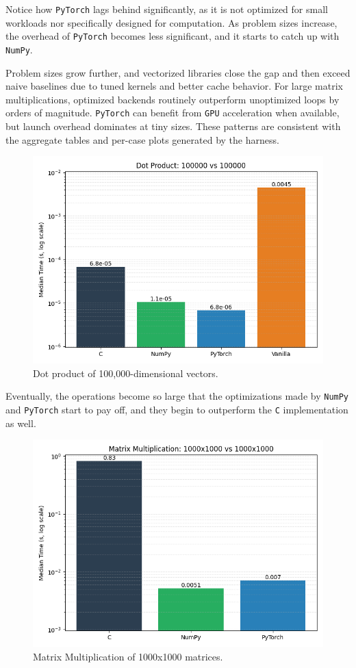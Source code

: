 \documentclass[a4paper,12pt]{article}
\begin{document}
Notice how \texttt{PyTorch} lags behind significantly, as it is not optimized for small workloads nor specifically designed for computation. As problem sizes increase, the overhead of \texttt{PyTorch} becomes less significant, and it starts to catch up with \texttt{NumPy}.

Problem sizes grow further, and vectorized libraries close the gap and then exceed naive baselines due to tuned kernels and better cache behavior. For large matrix multiplications, optimized backends routinely outperform unoptimized loops by orders of magnitude. \texttt{PyTorch} can benefit from \texttt{GPU} acceleration when available, but launch overhead dominates at tiny sizes. These patterns are consistent with the aggregate tables and per-case plots generated by the harness.

\begin{figure}[H]
  \centering
  \includegraphics[width=0.7\linewidth]{results/bar/DOT_100000_100000.png}
  \caption{Dot product of 100{,}000-dimensional vectors.}
  \label{fig:three}
\end{figure}

Eventually, the operations become so large that the optimizations made by \texttt{NumPy} and \texttt{PyTorch} start to pay off, and they begin to outperform the \texttt{C} implementation as well.

\begin{figure}[H]
  \centering
  \includegraphics[width=0.7\linewidth]{results/bar/MM_1000x1000_1000x1000.png}
  \caption{Matrix Multiplication of 1000x1000 matrices.}
  \label{fig:four}
\end{figure}
\end{document}
